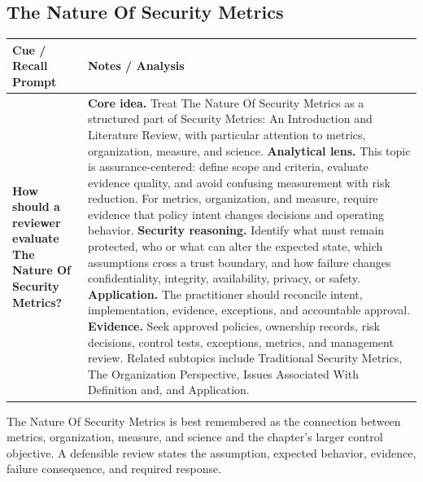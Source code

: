 \documentclass[11pt]{article}
\newcommand{\CornellHeader}{%
\rowcolor{Navy}\color{white}\bfseries Cue / Recall Prompt & \color{white}\bfseries Notes / Analysis\\\hline}
\newcommand{\CornellRow}[2]{%
\cellcolor{CueGray}\RaggedRight\textbf{#1} & \RaggedRight #2\\\hline}
\begin{document}
\subsection*{The Nature Of Security Metrics}
\begin{longtable}{>{\RaggedRight\arraybackslash}p{}|>{\RaggedRight\arraybackslash}p{}}
\CornellHeader
\CornellRow{How should a reviewer evaluate The Nature Of Security Metrics?}{\textbf{Core idea.} Treat The Nature Of Security Metrics as a structured part of Security Metrics: An Introduction and Literature Review, with particular attention to metrics, organization, measure, and science. \textbf{Analytical lens.} This topic is assurance-centered: define scope and criteria, evaluate evidence quality, and avoid confusing measurement with risk reduction. For metrics, organization, and measure, require evidence that policy intent changes decisions and operating behavior. \textbf{Security reasoning.} Identify what must remain protected, who or what can alter the expected state, which assumptions cross a trust boundary, and how failure changes confidentiality, integrity, availability, privacy, or safety. \textbf{Application.} The practitioner should reconcile intent, implementation, evidence, exceptions, and accountable approval. \textbf{Evidence.} Seek approved policies, ownership records, risk decisions, control tests, exceptions, metrics, and management review. Related subtopics include Traditional Security Metrics, The Organization Perspective, Issues Associated With Definition and, and Application.}
\end{longtable}
\begin{topicsummary}
The Nature Of Security Metrics is best remembered as the connection between metrics, organization, measure, and science and the chapter's larger control objective. A defensible review states the assumption, expected behavior, evidence, failure consequence, and required response.
\end{topicsummary}
\end{document}
